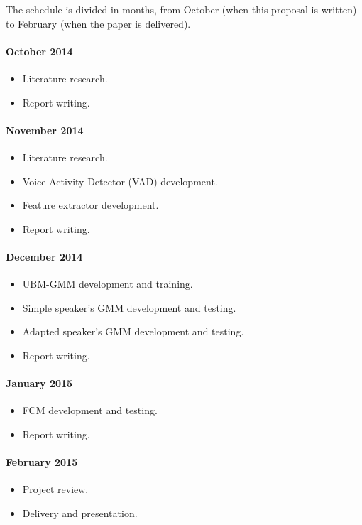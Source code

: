 \documentclass[a4paper,twocolumn]{article}
\begin{document}
The schedule is divided in months, from October (when this proposal is written) to February (when the paper is delivered).

\paragraph{\textbf{October 2014}}
\begin{itemize}[noitemsep]
    \item Literature research.
    \item Report writing.
\end{itemize}

\paragraph{\textbf{November 2014}}
\begin{itemize}[noitemsep]
    \item Literature research.
    \item Voice Activity Detector (VAD) development.
    \item Feature extractor development.
    \item Report writing.
\end{itemize}

\paragraph{\textbf{December 2014}}
\begin{itemize}[noitemsep]
    \item UBM-GMM development and training.
    \item Simple speaker's GMM development and testing.
    \item Adapted speaker's GMM development and testing.
    \item Report writing.
\end{itemize}

\paragraph{\textbf{January 2015}}
\begin{itemize}[noitemsep]
    \item FCM development and testing.
    \item Report writing.
\end{itemize}

\paragraph{\textbf{February 2015}}
\begin{itemize}[noitemsep]
    \item Project review.
    \item Delivery and presentation.
\end{itemize}
\end{document}

